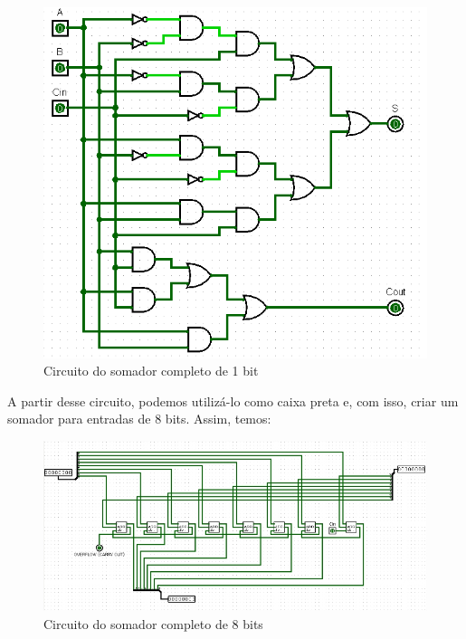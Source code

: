 \documentclass[
	12pt,				%
	openright,			%
	twoside,			%
	a4paper,			%
	english,			%
	french,				%
	spanish,			%
	brazil,				%
	]{abntex2}
\begin{document}
\begin{figure}[H]
	\begin{center}
	    \includegraphics[scale=0.5]{somador1b.png}
	\end{center}
\caption{\label{somador1b}Circuito do somador completo de 1 bit}
\end{figure}

A partir desse circuito, podemos utilizá-lo como caixa preta e, com isso, criar um somador para entradas de 8 bits. Assim, temos:

\begin{figure}[H]
	\begin{center}
	    \includegraphics[scale=0.5]{somador8b.jpg}
	\end{center}
\caption{\label{somador8b}Circuito do somador completo de 8 bits}
\end{figure}
\end{document}
